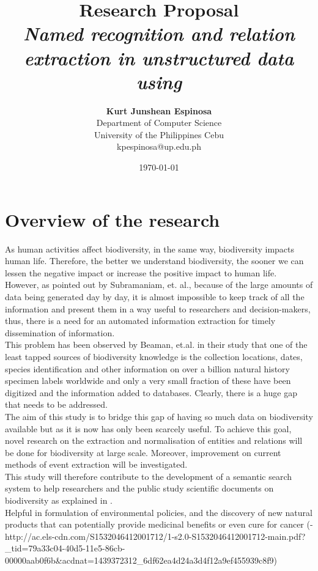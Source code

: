 \documentclass[12pt]{article}
\title{{\bf Research Proposal} \\
\it Named recognition and relation extraction in unstructured data using }
\author{ {\bf Kurt Junshean Espinosa}  \\
Department of Computer Science \\
University of the Philippines Cebu\\
{\small kpespinosa@up.edu.ph}
}
\date{\today}
\begin{document}
\pagestyle{plain}
\maketitle



\pagebreak
\tableofcontents
\pagebreak

\cleardoublepage
{}

\section{Overview of the research}
\label{ch:intro}
As human activities affect biodiversity, in the same way, biodiversity impacts human life. Therefore, the better we understand biodiversity, the sooner we can lessen the negative impact or increase the positive impact to human life. However, as pointed out by Subramaniam, et. al.\cite{subramaniam2003information}, because of the large amounts of data being generated day by day, it is almost impossible to keep track of all the information  and present them in a way useful to researchers and decision-makers, thus, there is a need for an automated information extraction for timely dissemination of information. \\

This problem has been observed by Beaman, et.al.  in their study\cite{beaman2006herbis} that one of the least tapped sources of biodiversity knowledge is the collection locations, dates, species identification and other information on over a billion natural history specimen labels worldwide and only a very small fraction of these have been digitized and the information added to databases. Clearly, there is a huge gap that needs to be addressed.\\

The aim of this study is to bridge this gap of having so much data on biodiversity available but as it is now has only been scarcely useful. To achieve this goal, novel research on the extraction and normalisation of entities and relations will be done for biodiversity at large scale. Moreover, improvement on current methods of event extraction will be investigated. \\

This study will therefore contribute to the development of a semantic search system to help researchers and the public study scientific documents on biodiversity as explained in \cite{jisc}.\\
Helpful in formulation of environmental policies, and the discovery of new natural products that can potentially provide medicinal benefits or even cure for cancer (- http://ac.els-cdn.com/S1532046412001712/1-s2.0-S1532046412001712-main.pdf?_tid=79a33c04-40d5-11e5-86cb-00000aab0f6b&acdnat=1439372312_6df62ea4d24a3d4f12a9ef455939c8f9)
\end{document}
